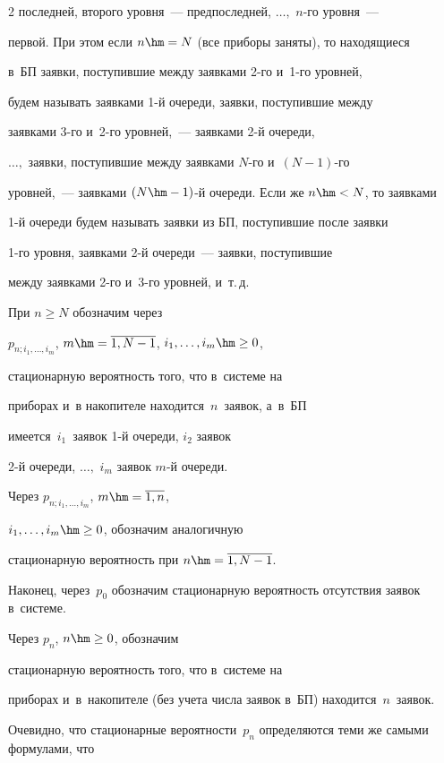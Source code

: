 \begin{multicols}{2}
последней, второго уровня~--- предпоследней, $\ldots,$ $n$-го уровня~--- 


первой. При этом если $n\hm=N$ (все приборы заняты), то находящиеся


в~БП заявки, поступившие между заявками 2-го и~1-го уровней,


будем называть заявками 1-й очереди, заявки, поступившие между


заявками 3-го и~2-го уровней,~--- заявками 2-й очереди,


$\ldots,$ заявки, поступившие между заявками $N$-го и~$(N-1)$-го


уровней,~--- заявками $(N\hm-1)$-й очереди. Если же $n\hm<N$, то  заявками


1-й очереди будем называть заявки из БП, поступившие после заявки


1-го уровня, заявками 2-й очереди~--- заявки, поступившие


между заявками 2-го и~3-го уровней, и~т.\,д.





При $n\ge N$ обозначим через


$p_{n;i_1,\ldots,i_m}$, $m\hm=\overline{1,N-1}$, $i_1,\ldots,i_m\hm\ge 0$,


стационарную вероятность того, что в~системе на


приборах и~в накопителе находится~$n$~заявок, а~в~БП


имеется~$i_1$~заявок 1-й очереди, $i_2$ заявок


2-й очереди, $\ldots,$ $i_{m}$ заявок $m$-й очереди.


Через $p_{n;i_1,\ldots,i_m}$, $m\hm=\overline{1,n}$,


$i_1,\ldots,i_m\hm\ge 0$, обозначим аналогичную


стационарную вероятность при $n\hm=\overline{1,N-1}$.


Наконец, через~$p_0$ обозначим стационарную вероятность отсутствия заявок в~системе.





Через $p_n$, ${n\hm\ge 0}$, обозначим


стационарную веро\-ят\-ность того, что в~системе на


приборах и~в~нако\-пи\-те\-ле (без учета числа заявок в~БП) находится~$n$~заявок.


Очевидно, что стационарные вероятности~$p_n$ определяются теми же самыми формулами, что 



\end{multicols}
